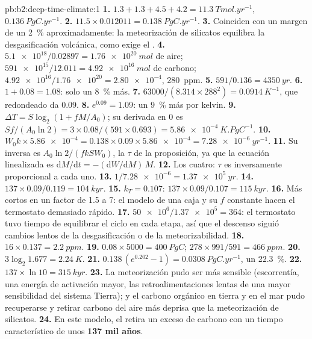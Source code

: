 \begin{solution}{pb:b2:deep-time-climate:1}
\textbf{1.} $1.3 + 1.3 + 4.5 + 4.2 = \qty{11.3}{Tmol.yr^{-1}}$, $\qty{0.136}{PgC.yr^{-1}}$.
\textbf{2.} $11.5\times0.012011 = \qty{0.138}{PgC.yr^{-1}}$.
\textbf{3.} Coinciden con un margen de un \qty{2}{\percent} aproximadamente: la meteorización de silicatos equilibra la desgasificación
volcánica, como exige el .
\textbf{4.} $\num{5.1e18}/0.02897 = \qty{1.76e20}{mol}$ de aire; $\num{591e15}/12.011 =
\qty{4.92e16}{mol}$ de carbono; $\num{4.92e16}/\num{1.76e20} = \num{2.80e-4}$, \qty{280}{ppm}.
\textbf{5.} $591/0.136 = \qty{4350}{yr}$.
\textbf{6.} $1 + 0.08 = 1.08$: solo un \qty{8}{\percent} más.
\textbf{7.} $63000/(8.314\times288^2) = \qty{0.0914}{K^{-1}}$, que redondeado da 0.09.
\textbf{8.} $e^{0.09} = 1.09$: un \qty{9}{\percent} más por kelvin.
\textbf{9.} $\Delta T = S\log_2(1 + fM/A_0)$; su derivada en 0 es $Sf/(A_0\ln2) =
3\times0.08/(591\times0.693) = \qty{5.86e-4}{K.PgC^{-1}}$.
\textbf{10.} $W_0k\times\num{5.86e-4} = 0.138\times0.09\times\num{5.86e-4} = \qty{7.28e-6}{yr^{-1}}$.
\textbf{11.} Su inversa es $A_0\ln2/(fkSW_0)$, la $\tau$ de la proposición, ya que la
ecuación linealizada es $\mathrm dM/\mathrm dt = -(\mathrm dW/\mathrm dM)\,M$.
\textbf{12.} Los cuatro: $\tau$ es inversamente proporcional a cada uno.
\textbf{13.} $1/\num{7.28e-6} = \qty{1.37e5}{yr}$.
\textbf{14.} $137\times0.09/0.119 = \qty{104}{kyr}$.
\textbf{15.} $k_T = 0.107$: $137\times0.09/0.107 = \qty{115}{kyr}$.
\textbf{16.} Más cortos en un factor de 1.5 a 7: el modelo de una caja y su $f$ constante hacen el
termostato demasiado rápido.
\textbf{17.} $\num{50e6}/\num{1.37e5} = 364$: el termostato tuvo tiempo de equilibrar el ciclo en cada
etapa, así que el descenso siguió cambios lentos de la desgasificación o de la meteorizabilidad.
\textbf{18.} $16\times0.137 = \qty{2.2}{ppm}$.
\textbf{19.} $0.08\times5000 = \qty{400}{PgC}$; $278\times991/591 = \qty{466}{ppm}$.
\textbf{20.} $3\log_2 1.677 = \qty{2.24}{K}$.
\textbf{21.} $0.138\,(e^{0.202} - 1) = \qty{0.0308}{PgC.yr^{-1}}$, un \qty{22.3}{\percent}.
\textbf{22.} $137\times\ln10 = \qty{315}{kyr}$.
\textbf{23.} La meteorización pudo ser más sensible (escorrentía, una energía de activación mayor, las
retroalimentaciones lentas de una mayor sensibilidad del sistema Tierra); y el carbono orgánico en tierra y en el mar pudo
recuperarse y retirar carbono del aire más deprisa que la meteorización de silicatos.
\textbf{24.} En este modelo, el  retira un exceso de carbono con un
tiempo característico de unos \textbf{\qty[text-series-to-math=true]{137}{} mil años}.
\end{solution}

